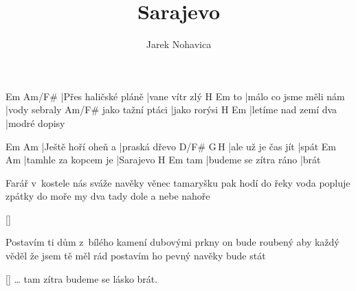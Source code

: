 \documentclass{song}
\title{Sarajevo}
\author{Jarek Nohavica}
\begin{document}
\strophe
Em                   Am/F\#
|Přes haličské pláně |vane vítr zlý
   H\7                    Em
to |málo co jsme měli nám |vody sebraly
                 Am/F\#
jako tažní ptáci |jako rorýsi
H\7                  Em
|letíme nad zemí dva |modré dopisy
\endstrophe

Em                 Am
|Ještě hoří oheň a |praská dřevo
D\7/F\#            G\,H\7
|ale už je čas jít |spát
Em                   Am
|tamhle za kopcem je |Sarajevo
    H\7                   Em
tam |budeme se zítra ráno |brát
\endstrophe

\strophe*
Farář v~kostele nás sváže navěky
věnec tamaryšku pak hodí do řeky
voda popluje zpátky do moře
my dva tady dole a nebe nahoře
\endstrophe

\ref{}

\strophe*
Postavím ti dům z~bílého kamení
dubovými prkny on bude roubený
aby každý věděl že jsem tě měl rád
postavím ho pevný navěky bude stát
\endstrophe

\ref{} \ldots{} tam zítra budeme se lásko brát.
\end{document}
